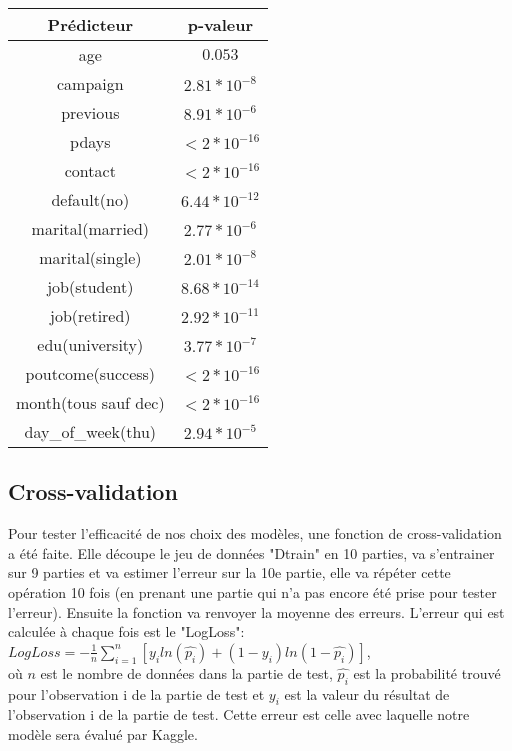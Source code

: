 \documentclass[11pt]{article}
\begin{document}
	\begin{center}
  	 	\begin{tabular}{| c | c |}
  	 	\hline
  	 	Prédicteur & p-valeur \\
  	 	\hline
  	 	age & $0.053$ \\
  	 	\hline
  	 	campaign & $2.81*10^{-8}$ \\
  	 	\hline
  	 	previous & $8.91*10^{-6}$ \\
		\hline  	 	
  	 	pdays & $<2*10^{-16}$ \\
		\hline
		contact & $<2*10^{-16}$ \\
  	 	\hline
  	 	default(no) & $6.44*10^{-12}$ \\
  	 	\hline
  	 	marital(married) & $2.77*10^{-6}$ \\
  	 	\hline
  	 	marital(single) & $2.01*10^{-8}$ \\
  	 	\hline
  	 	job(student) & $8.68*10^{-14}$ \\
  	 	\hline
  	 	job(retired) & $2.92*10^{-11}$ \\
  	 	\hline
  	 	edu(university) & $3.77*10^{-7}$ \\
  	 	\hline
  	 	poutcome(success) & $<2*10^{-16}$ \\
  	 	\hline
  	 	month(tous sauf dec) & $<2*10^{-16}$ \\
  	 	\hline
  	 	day\_of\_week(thu) & $2.94*10^{-5}$ \\
  	 	\hline
  	 	\end{tabular}
  	\end{center}
	\subsection{Cross-validation}
	Pour tester l'efficacité de nos choix des modèles, une fonction de cross-validation a été faite. Elle découpe le jeu de données "Dtrain" en 10 parties, va s'entrainer sur 9 parties et va estimer l'erreur sur la 10e partie, elle va répéter cette opération 10 fois (en prenant une partie qui n'a pas encore été prise pour tester l'erreur). Ensuite la fonction va renvoyer la moyenne des erreurs. L'erreur qui est calculée à chaque fois est le "LogLoss": 
	\\ $LogLoss=-\frac{1}{n}\sum_{i=1}^{n}[y_iln(\widehat{p_i})+(1-y_i)ln(1-\widehat{p_i})]$, 
	\\où $n$ est le nombre de données dans la partie de test, $\widehat{p_i}$ est la probabilité trouvé pour l'observation i de la partie de test et $y_i$ est la valeur du résultat de l'observation i de la partie de test. Cette erreur est celle avec laquelle notre modèle sera évalué par Kaggle. 
\end{document}
